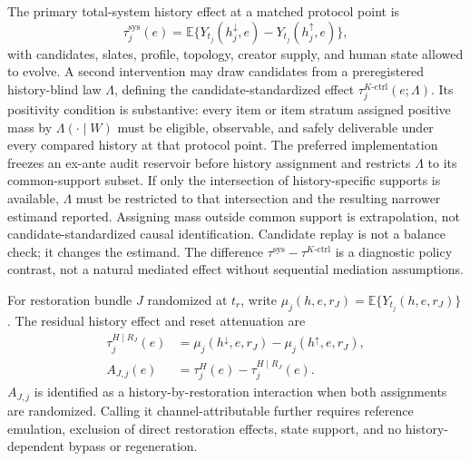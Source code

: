 \documentclass[pdflatex,sn-mathphys-num]{sn-jnl}
\newcommand{\E}{\mathbb{E}}
\begin{document}
The primary total-system history effect at a matched protocol point is
\begin{equation}
\tau_j^{\mathrm{sys}}(e)=
\E\{Y_{t_j}(h_j^\downarrow,e)-Y_{t_j}(h_j^\uparrow,e)\},
\label{eq:total-system-effect}
\end{equation}
with candidates, slates, profile, topology, creator supply, and human state allowed to evolve. A second intervention may draw candidates from a preregistered history-blind law $\Lambda$, defining the candidate-standardized effect $\tau_j^{K\text{-}\mathrm{ctrl}}(e;\Lambda)$. Its positivity condition is substantive: every item or item stratum assigned positive mass by $\Lambda(\cdot\mid W)$ must be eligible, observable, and safely deliverable under every compared history at that protocol point. The preferred implementation freezes an ex-ante audit reservoir before history assignment and restricts $\Lambda$ to its common-support subset. If only the intersection of history-specific supports is available, $\Lambda$ must be restricted to that intersection and the resulting narrower estimand reported. Assigning mass outside common support is extrapolation, not candidate-standardized causal identification. Candidate replay is not a balance check; it changes the estimand. The difference $\tau^{\mathrm{sys}}-\tau^{K\text{-}\mathrm{ctrl}}$ is a diagnostic policy contrast, not a natural mediated effect without sequential mediation assumptions.

For restoration bundle $J$ randomized at $t_r$, write $\mu_j(h,e,r_J)=\E\{Y_{t_j}(h,e,r_J)\}$. The residual history effect and reset attenuation are
\begin{align}
\tau_j^{H\mid R_J}(e)&=\mu_j(h^\downarrow,e,r_J)-\mu_j(h^\uparrow,e,r_J),\\
A_{J,j}(e)&=\tau_j^H(e)-\tau_j^{H\mid R_J}(e).
\label{eq:reset-attenuation}
\end{align}
$A_{J,j}$ is identified as a history-by-restoration interaction when both assignments are randomized. Calling it channel-attributable further requires reference emulation, exclusion of direct restoration effects, state support, and no history-dependent bypass or regeneration.
\end{document}
